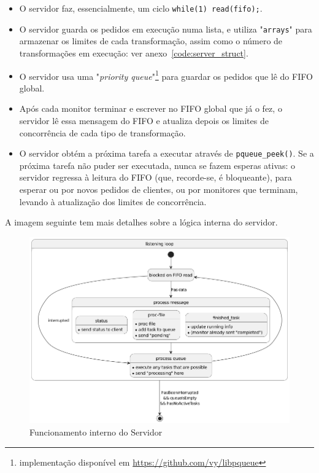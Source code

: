 \documentclass[11pt,a4paper]{report}%
\begin{document}
\begin{itemize}
  \item O servidor faz, essencialmente, um ciclo \lstinline{while(1) read(fifo);}.
  \item O servidor guarda os pedidos em execução numa lista, e utiliza "\lstinline{arrays}" para armazenar
  os limites de cada transformação, assim como o número de transformações em execução: ver anexo~\ref{code:server_struct}.
  \item O servidor usa uma "\textit{priority queue}"\footnote{implementação disponível em \url{https://github.com/vy/libpqueue}}\label{footnote:pqueue}
  para guardar os pedidos que lê do FIFO global.
  \item Após cada monitor terminar e escrever no FIFO global que já o fez, o servidor lê essa mensagem do FIFO
  e atualiza depois os limites de concorrência de cada tipo de transformação.
  \item O servidor obtém a próxima tarefa a executar através de \lstinline{pqueue_peek()}. Se a próxima tarefa
  não puder ser executada, nunca se fazem esperas ativas: o servidor regressa à leitura do FIFO
  (que, recorde-se, é bloqueante), para esperar ou por novos pedidos de clientes, ou por monitores que terminam,
  levando à atualização dos limites de concorrência.
\end{itemize}

A imagem seguinte tem mais detalhes sobre a lógica interna do servidor.

\begin{figure}[H]
  \centering
  \includegraphics[scale=0.55]{loopLogic.png}
  \caption{Funcionamento interno do Servidor}
  \label{fig:server}
\end{figure}
\end{document}
